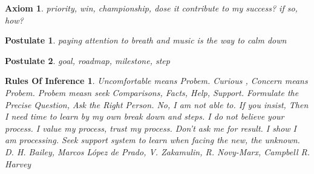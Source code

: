\documentclass{article}
\newtheorem{axiom}{Axiom}
\newtheorem{postulate}{Postulate}
\newtheorem{rules of inference}{Rules Of Inference}
\begin{document}
\begin{axiom}
    priority,
    win, championship,
    dose it contribute to my success? if so, how?
\end{axiom}

\begin{postulate}
    paying attention to breath and music is the way to calm down
\end{postulate}

\begin{postulate}
    goal,
    roadmap,
    milestone,
    step
\end{postulate}

\begin{rules of inference}
    Uncomfortable means Probem.
    Curious , Concern means Probem.
    Probem measn seek Comparisons, Facts, Help, Support.
    Formulate the Precise Question, Ask the Right Person.
    No, I am not able to. If you insist,
    Then I need time to learn by my own break down and steps.
    I do not believe your process.
    I value my process, trust my process.
    Don't ask me for result. I show I am  processing.
    Seek support system to learn when facing the new, the unknown.
    D. H. Bailey, Marcos López de Prado, V. Zakamulin, R. Novy-Marx, Campbell R. Harvey
\end{rules of inference}
\end{document}
